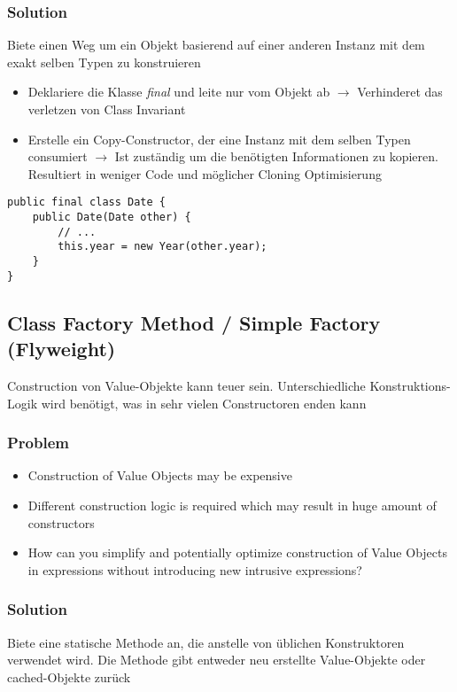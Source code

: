 \subsubsection{Solution}
Biete einen Weg um ein Objekt basierend auf einer anderen Instanz mit dem exakt selben Typen zu konstruieren

\begin{itemize}
    \item Deklariere die Klasse \textit{final} und leite nur vom Objekt ab $\rightarrow$ Verhinderet das verletzen von Class Invariant
    \item Erstelle ein Copy-Constructor, der eine Instanz mit dem selben Typen consumiert $\rightarrow$ Ist zuständig um die benötigten Informationen zu kopieren. Resultiert in weniger Code und möglicher Cloning Optimisierung
\end{itemize}
\begin{lstlisting}
public final class Date {
    public Date(Date other) {
        // ...
        this.year = new Year(other.year);
    }
}
\end{lstlisting}

\subsection{Class Factory Method / Simple Factory (Flyweight)}

Construction von Value-Objekte kann teuer sein. Unterschiedliche Konstruktions-Logik wird benötigt, was in sehr vielen Constructoren enden kann

\subsubsection{Problem}
\begin{itemize}
    \item Construction of Value Objects may be expensive
    \item Different construction logic is required which may result in huge amount of constructors
    \item How can you simplify and potentially optimize construction of Value Objects in expressions without introducing new intrusive expressions?
\end{itemize}

\subsubsection{Solution}

Biete eine statische Methode an, die anstelle von üblichen Konstruktoren verwendet wird. Die Methode gibt entweder neu erstellte Value-Objekte oder cached-Objekte zurück

